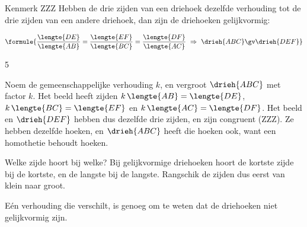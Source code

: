 \begin{theorie}
\begin{stelling}{Kenmerk ZZZ}
Hebben de drie zijden van een driehoek dezelfde verhouding tot de drie zijden van een andere driehoek, dan zijn de driehoeken gelijkvormig:

\vspace{1mm}
\qquad $\formule{\dfrac{\lengte{DE}}{\lengte{AB}} = \dfrac{\lengte{EF}}{\lengte{BC}} = \dfrac{\lengte{DF}}{\lengte{AC}} \ \Rightarrow \ \drieh{ABC} \gv \drieh{DEF}}$
\end{stelling}
\begin{alleenvoor}{5}

\begin{bewijs}
Noem de gemeenschappelijke verhouding $k$, en vergroot $\drieh{ABC}$ met factor $k$. Het beeld heeft zijden $k\,\lengte{AB} = \lengte{DE}$, $k\,\lengte{BC} = \lengte{EF}$ en $k\,\lengte{AC} = \lengte{DF}$. Het beeld en $\drieh{DEF}$ hebben dus dezelfde drie zijden, en zijn congruent (ZZZ). Ze hebben dezelfde hoeken, en $\drieh{ABC}$ heeft die hoeken ook, want een homothetie behoudt hoeken.
\end{bewijs}
\end{alleenvoor}
\end{theorie}

Welke zijde hoort bij welke? Bij gelijkvormige driehoeken hoort de kortste zijde bij de kortste, en de langste bij de langste. Rangschik de zijden dus eerst van klein naar groot.


Eén verhouding die verschilt, is genoeg om te weten dat de driehoeken niet gelijkvormig zijn.



